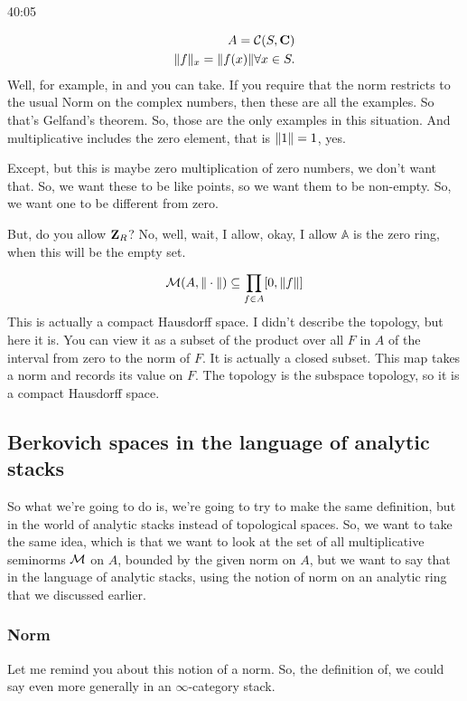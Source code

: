 \begin{example}
\begin{unfinished}{40:05}
\begin{example} 
\begin{align*}
A = \mathcal{C}(S, \mathbf C) \\
\| f \|_x = \| f(x) \| \forall x \in S.
\end{align*}
Well, for example, in and you can take. If you require that the norm restricts to the usual Norm on the complex numbers, then these are all the examples. So that's Gelfand's theorem. So, those are the only examples in this situation. And multiplicative includes the zero element, that is $\| 1 \| = 1$, yes.

Except, but this is maybe zero multiplication of zero numbers, we don't want that. So, we want these to be like points, so we want them to be non-empty. So, we want one to be different from zero.

But, do you allow $\mathbf Z_R$? No, well, wait, I allow, okay, I allow $\mathbb{A}$ is the zero ring, when this will be the empty set.
\end{example}

\begin{align}
\mathcal{M}(A, \| \cdot \|) \subseteq \prod_{f \in A} [0, \| f \| ]
\end{align}
This is actually a compact Hausdorff space. I didn't describe the topology, but here it is. You can view it as a subset of the product over all $F$ in $A$ of the interval from zero to the norm of $F$. It is actually a closed subset. This map takes a norm and records its value on $F$. The topology is the subspace topology, so it is a compact Hausdorff space.

\subsection{Berkovich spaces in the language of analytic stacks} \label{subsec:berk_spaces_language_analytic_stacks}
So what we're going to do is, we're going to try to make the same definition, but in the world of analytic stacks instead of topological spaces. So, we want to take the same idea, which is that we want to look at the set of all multiplicative seminorms $\mathcal{M}$ on $A$, bounded by the given norm on $A$, but we want to say that in the language of analytic stacks, using the notion of norm on an analytic ring that we discussed earlier.

\subsubsection{Norm} \label{subsubsec:norm_reminder}
Let me remind you about this notion of a norm. So, the definition of, we could say even more generally in an $\infty$-category stack. 


\end{unfinished}
\end{example}
